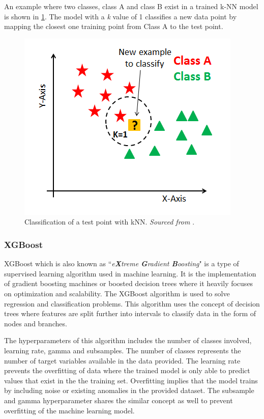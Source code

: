An example where two classes, class A and class B exist in a trained k-NN model is shown in \ref{fig_knn}. The model with a \textit{k} value of 1 classifies a new data point by mapping the closest one training point from Class A to the test point.

\begin{figure} [ht]
    \centering
    \includegraphics[scale=0.6]{pages/Chapter2/Chapter 2 images/knn.png}
    \caption{Classification of a test point with kNN. \textit{Sourced from} \cite{chauhan_2019}.}
    \label{fig_knn}
\end{figure}
 
\subsubsection{XGBoost}
XGBoost which is also known as ``\textit{e\textbf{X}treme \textbf{G}radient \textbf{B}oosting}" is a type of supervised learning algorithm used in machine learning. It is the implementation of gradient boosting machines or boosted decision trees where it heavily focuses on optimization and scalability. The XGBoost algorithm is used to solve regression and classification problems. This algorithm uses the concept of decision trees where features are split further into intervals to classify data in the form of nodes and branches.

The hyperparameters of this algorithm includes the number of classes involved, learning rate, gamma and subsamples. The number of classes represents the number of target variables available in the data provided. The learning rate prevents the overfitting of data where the trained model is only able to predict values that exist in the the training set.
Overfitting implies that the model trains by including noise or existing anomalies in the provided dataset. The subsample and gamma hyperparameter shares the similar concept as well to prevent overfitting of the machine learning model. 

